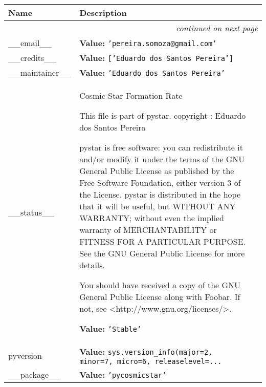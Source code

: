     \vspace{-1cm}
\hspace{\varindent}\begin{longtable}{|p{\varnamewidth}|p{\vardescrwidth}|l}
\cline{1-2}
\cline{1-2} \centering \textbf{Name} & \centering \textbf{Description}& \\
\cline{1-2}
\endhead\cline{1-2}\multicolumn{3}{r}{\small\textit{continued on next page}}\\\endfoot\cline{1-2}
\endlastfoot\raggedright \_\-\_\-e\-m\-a\-i\-l\-\_\-\_\- & \raggedright \textbf{Value:} 
{\tt \texttt{'}\texttt{pereira.somoza@gmail.com}\texttt{'}}&\\
\cline{1-2}
\raggedright \_\-\_\-c\-r\-e\-d\-i\-t\-s\-\_\-\_\- & \raggedright \textbf{Value:} 
{\tt \texttt{[}\texttt{'}\texttt{Eduardo dos Santos Pereira}\texttt{'}\texttt{]}}&\\
\cline{1-2}
\raggedright \_\-\_\-m\-a\-i\-n\-t\-a\-i\-n\-e\-r\-\_\-\_\- & \raggedright \textbf{Value:} 
{\tt \texttt{'}\texttt{Eduardo dos Santos Pereira}\texttt{'}}&\\
\cline{1-2}
\raggedright \_\-\_\-s\-t\-a\-t\-u\-s\-\_\-\_\- & \raggedright Cosmic Star Formation Rate

          This file is part of pystar. copyright : Eduardo dos Santos 
          Pereira

          pystar is free software: you can redistribute it and/or modify it
          under the terms of the GNU General Public License as published by
          the Free Software Foundation, either version 3 of the License. 
          pystar is distributed in the hope that it will be useful, but 
          WITHOUT ANY WARRANTY; without even the implied warranty of 
          MERCHANTABILITY or FITNESS FOR A PARTICULAR PURPOSE.  See the GNU
          General Public License for more details.

          You should have received a copy of the GNU General Public License
          along with Foobar.  If not, see 
          {\textless}http://www.gnu.org/licenses/{\textgreater}.

\textbf{Value:} 
{\tt \texttt{'}\texttt{Stable}\texttt{'}}&\\
\cline{1-2}
\raggedright p\-y\-v\-e\-r\-s\-i\-o\-n\- & \raggedright \textbf{Value:} 
{\tt sys.version\_info(major=2, minor=7, micro=6, releaselevel=\texttt{...}}&\\
\cline{1-2}
\raggedright \_\-\_\-p\-a\-c\-k\-a\-g\-e\-\_\-\_\- & \raggedright \textbf{Value:} 
{\tt \texttt{'}\texttt{pycosmicstar}\texttt{'}}&\\
\cline{1-2}
\end{longtable}


